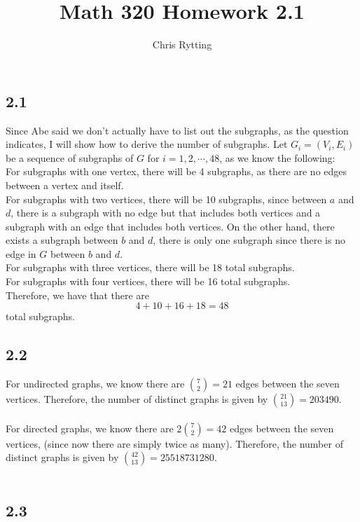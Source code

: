 \documentclass[letterpaper,12pt]{article}
\theoremstyle{definition}
\begin{document}
\title{Math 320 Homework 2.1}
\author{Chris Rytting}
\maketitle

\subsection*{2.1}
Since Abe said we don't actually have to list out the subgraphs, as the question indicates, I will show how to derive the number of subgraphs.
Let $G_i = (V_i, E_i)$ be a sequence of subgraphs of $G$ for $i = 1,2,\cdots,48$, as we know the following:
\\
For subgraphs with one vertex, there will be 4 subgraphs, as there are no edges between a vertex and itself. 
\\For subgraphs with two vertices, there will be 10 subgraphs, since between $a$ and $d$, there is a subgraph with no edge but that includes both vertices and a subgraph with an edge that includes both vertices. On the other hand, there exists a subgraph between $b$ and $d$, there is only one subgraph since there is no edge in $G$ between $b$ and $d$. 
\\For subgraphs with three vertices, there will be 18 total subgraphs.
\\For subgraphs with four vertices, there will be 16 total subgraphs.
\\Therefore, we have that there are 
\[4+ 10 + 16+ 18 = 48\]
total subgraphs.

\subsection*{2.2}

For undirected graphs, we know there are $\binom 72 = 21$ edges between the seven vertices. Therefore, the number of distinct graphs is given by $\binom {21}{13} = 203490$. \\\\
For directed graphs, we know there are $2\binom 72 = 42$ edges between the seven vertices, (since now there are simply twice as many). Therefore, the number of distinct graphs is given by $\binom {42}{13} = 25518731280$. \\\\

\subsection*{2.3}
\end{document}
